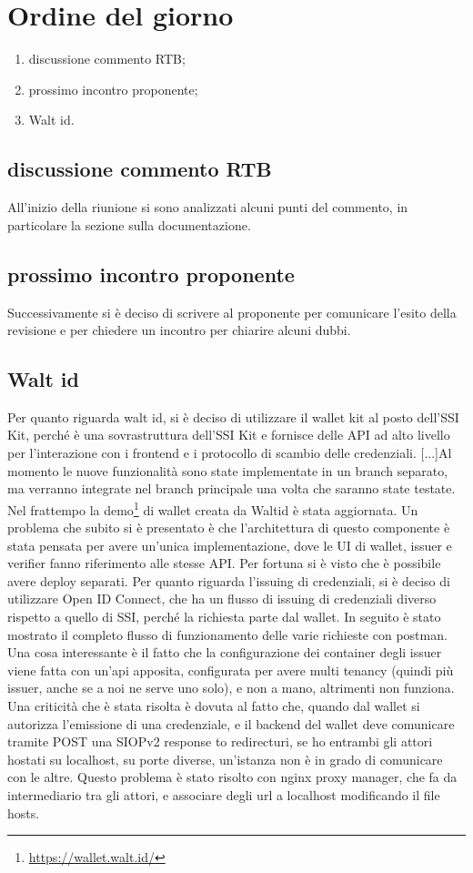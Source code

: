 \section{Ordine del giorno}
\begin{enumerate}
\item discussione commento RTB;
\item prossimo incontro proponente;
\item Walt id.%
\end{enumerate}
\subsection{discussione commento RTB}
All'inizio della riunione si sono analizzati alcuni punti del commento, in particolare la sezione sulla documentazione.
\subsection{prossimo incontro proponente}
Successivamente si è deciso di scrivere al proponente per comunicare l'esito della revisione e per chiedere un incontro per chiarire alcuni dubbi. %
\subsection{Walt id}
Per quanto riguarda walt id, si è deciso di utilizzare il wallet kit al posto dell'SSI Kit, perché è una sovrastruttura dell'SSI Kit e fornisce delle API ad alto livello per l'interazione con i frontend e i protocollo di scambio delle credenziali.
[...]Al momento le nuove funzionalità sono state implementate in un branch separato, ma verranno integrate nel branch principale una volta che saranno state testate.
Nel frattempo la demo\footnote[1]{\url{https://wallet.walt.id/}} di wallet creata da Waltid è stata aggiornata.
Un problema che subito si è presentato è che l'architettura di questo componente è stata pensata per avere un'unica implementazione, dove le UI di wallet, issuer e verifier fanno riferimento alle stesse API. Per fortuna si è visto che è possibile avere deploy separati.
Per quanto riguarda l'issuing di credenziali, si è deciso di utilizzare Open ID Connect, che ha un flusso di issuing di credenziali diverso rispetto a quello di SSI, perché la richiesta parte dal wallet.
In seguito è stato mostrato il completo flusso di funzionamento delle varie richieste con postman. Una cosa interessante è il fatto che la configurazione dei container degli issuer viene fatta con un'api apposita, configurata per avere multi tenancy (quindi più issuer, anche se a noi ne serve uno solo), e non a mano, altrimenti non funziona.
Una criticità che è stata risolta è dovuta al fatto che, quando dal wallet si autorizza l'emissione di una credenziale, e il backend del wallet deve comunicare tramite POST una SIOPv2 response to redirecturi, se ho entrambi gli attori hostati su localhost, su porte diverse, un'istanza non è in grado di comunicare con le altre.
Questo problema è stato risolto con nginx proxy manager, che fa da intermediario tra gli attori, e associare degli url a localhost modificando il file hosts.